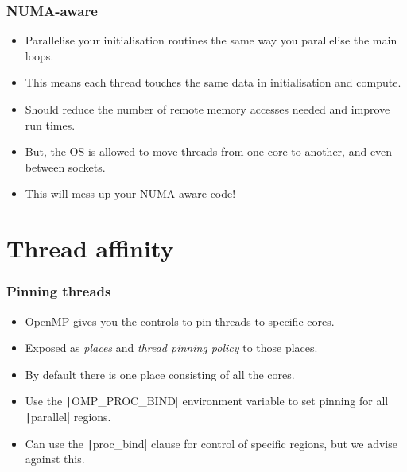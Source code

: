 \documentclass{beamer}
\begin{document}
\begin{frame}
\frametitle{NUMA-aware}
\begin{itemize}
  \item Parallelise your initialisation routines the same way you parallelise the main loops.
  \item This means each thread touches the same data in initialisation and compute.
  \item Should reduce the number of remote memory accesses needed and improve run times.
  \item But, the OS is allowed to move threads from one core to another, and even between sockets.
  \item This will mess up your NUMA aware code!
\end{itemize}
\end{frame}

\section{Thread affinity}
\begin{frame}
\frametitle{Pinning threads}
\begin{itemize}
  \item OpenMP gives you the controls to pin threads to specific cores.
  \item Exposed as \emph{places} and \emph{thread pinning policy} to those places.
  \item By default there is one place consisting of all the cores.
  \item Use the \texttt|OMP_PROC_BIND| environment variable to set pinning for all \texttt|parallel| regions.
  \item Can use the \texttt|proc_bind| clause for control of specific regions, but we advise against this.
\end{itemize}
\end{frame}
\end{document}
